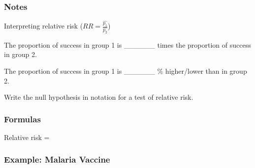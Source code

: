 \documentclass[
]{report}
\newcommand{\rgs}{\vspace{12pt}} %
\newcommand{\rgi}{\hspace{24pt}}  %
\begin{document}
\hypertarget{notes-27}{%
\subsubsection*{Notes}\label{notes-27}}

Interpreting relative risk (\(RR = \frac{\hat{p_1}}{\hat{p_2}}\))

\rgi The proportion of success in group 1 is \_\_\_\_\_\_ times the proportion of success in group 2.

\rgi The proportion of success in group 1 is \_\_\_\_\_\_ \% higher/lower than in group 2.

Write the null hypothesis in notation for a test of relative risk.
\rgs

\hypertarget{formulas-7}{%
\subsubsection*{Formulas}\label{formulas-7}}

Relative risk =
\rgs

\hypertarget{example-malaria-vaccine}{%
\subsubsection*{Example: Malaria Vaccine}\label{example-malaria-vaccine}}
\end{document}
